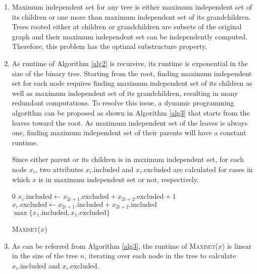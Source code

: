 \begin{enumerate}[label=(\alph*)]
\item Maximum independent set for any tree is either maximum independent set of its children or one more than maximum independent set of its grandchildren. Trees rooted either at children or grandchildren are subsets of the original graph and their maximum independent set can be independently computed. Therefore, this problem has the optimal substructure property.

\item As runtime of Algorithm \ref{alg2} is recursive, its runtime is exponential in the size of the binary tree. Starting from the root, finding maximum independent set for each node requires finding maximum independent set of its children as well as maximum independent set of its grandchildren, resulting in many redundant computations. To resolve this issue, a dynamic programming algorithm can be proposed as shown in Algorithm \ref{alg3} that starts from the leaves toward the root. As maximum independent set of the leaves is always one, finding maximum independent set of their parents will have a constant runtime.

Since either parent or its children is in maximum independent set, for each node $x_i$, two attributes $x_i.\text{included}$ and $x_i.\text{excluded}$ are calculated for cases in which $x$ is in maximum independent set or not, respectively.

\begin{algorithm}[H]
\begin{algorithmic}[1]
\State \Return $0$
\EndIf
{}
\State $x_i.\text{included} \leftarrow x_{2i+1}.\text{excluded} + x_{2i+2}.\text{excluded} + 1$
\State $x_i.\text{excluded} \leftarrow x_{2i+1}.\text{included} + x_{2i+2}.\text{included}$
\EndFor
\State \Return $\max\{x_1.\text{included}, x_1.\text{excluded}\}$
\end{algorithmic}
\caption{\textsc{Maxiset}($x$)}\label{alg3}
\end{algorithm}

\item As can be referred from Algorithm \ref{alg3}, the runtime of \textsc{Maxiset($x$)} is linear in the size of the tree $n$, iterating over each node in the tree to calculate $x_i.\text{included}$ and $x_i.\text{excluded}$.
\end{enumerate}
